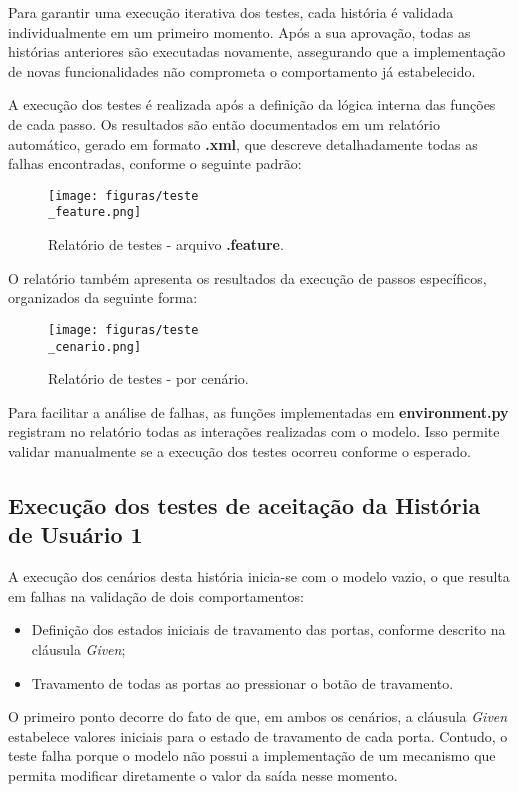 Para garantir uma execução iterativa dos testes, cada história é validada individualmente em um primeiro momento. Após a sua aprovação, todas as histórias anteriores 
são executadas novamente, assegurando que a implementação de novas funcionalidades não comprometa o comportamento já estabelecido.

A execução dos testes é realizada após a definição da lógica interna das funções de cada passo. Os resultados são então documentados em um relatório automático, gerado 
em formato \textbf{.xml}, que descreve detalhadamente todas as falhas encontradas, conforme o seguinte padrão:

\begin{figure}[H]
\centering
\texttt{[image: figuras/teste\\\_feature.png]}
\caption{Relatório de testes - arquivo \textbf{.feature}.}
\end{figure}

O relatório também apresenta os resultados da execução de passos específicos, organizados da seguinte forma:

\begin{figure}[H]
\centering
\texttt{[image: figuras/teste\\\_cenario.png]}
\caption{Relatório de testes - por cenário.}
\end{figure}

Para facilitar a análise de falhas, as funções implementadas em \textbf{environment.py} registram no relatório todas as interações realizadas com o modelo. Isso permite validar 
manualmente se a execução dos testes ocorreu conforme o esperado.

\subsection{Execução dos testes de aceitação da História de Usuário 1}

A execução dos cenários desta história inicia-se com o modelo vazio, o que resulta em falhas na validação de dois comportamentos:

\begin{itemize}
	\item Definição dos estados iniciais de travamento das portas, conforme descrito na cláusula \textit{Given};
	\item Travamento de todas as portas ao pressionar o botão de travamento.
\end{itemize}

O primeiro ponto decorre do fato de que, em ambos os cenários, a cláusula \textit{Given} estabelece valores iniciais para o estado de travamento de cada porta. Contudo, 
o teste falha porque o modelo não possui a implementação de um mecanismo que permita modificar diretamente o valor da saída nesse momento.

